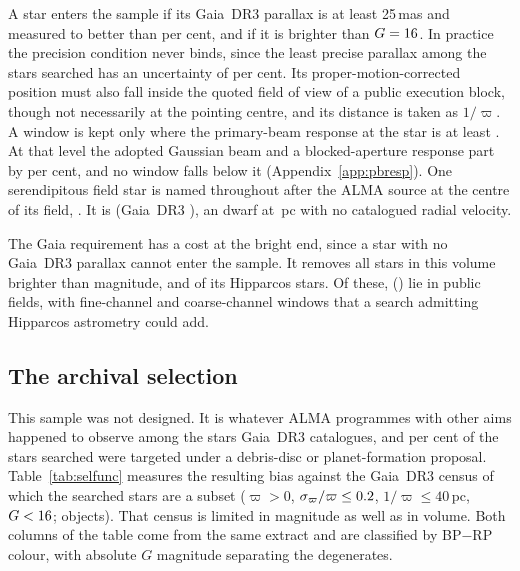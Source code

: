 A star enters the sample if its Gaia~DR3 parallax is at least 25\,mas and
measured to better than \PlxAdqlPct{} per cent, and if it is brighter than
$G=16$. In practice the precision condition
never binds, since the least precise parallax among the stars
searched has an uncertainty of \SfPlxWorstPct{} per cent.
Its proper-motion-corrected position must also fall inside the quoted field
of view of a public execution block, though not necessarily at the pointing
centre, and its distance is taken as $1/\varpi$. A window is kept only where
the primary-beam response at the star is at least \BmFloorResp. At that level
the adopted Gaussian beam and a blocked-aperture response part by
\BmFloorTolPct{} per cent, and no window falls below it
(Appendix~\ref{app:pbresp}). One serendipitous field star is named throughout
after the ALMA source at the centre of its field, \BkAlmaName. It is
\BkAlmaTwoMass{} (Gaia~DR3 \BkAlmaGaia), an \BkAlmaSpType{} dwarf at
\BkAlmaDistPc\,pc with no catalogued radial velocity.

The Gaia requirement has a cost at the bright end, since a star with no
Gaia~DR3 parallax cannot enter the sample. It removes all \BsNBright{} stars
in this volume brighter than \BsBrightMag{} magnitude, and \BsNGap{} of its
\BsNVol{} Hipparcos stars. Of these, \BsNAlmaWord{} (\BsStarList) lie in
public fields, with \BsNWinA{} fine-channel and \BsNWinB{} coarse-channel
windows that a search admitting Hipparcos astrometry could add.


\subsection{The archival selection}
\label{sec:bias}

This sample was not designed. It is whatever ALMA programmes with other aims
happened to observe among the stars Gaia~DR3 catalogues, and
\PctDiscProposal{} per cent of the stars searched were targeted under a
debris-disc or planet-formation proposal. Table~\ref{tab:selfunc} measures the
resulting bias against the Gaia~DR3 census of which the searched stars are a
subset ($\varpi>0$, $\sigma_\varpi/\varpi\le0.2$,
$1/\varpi\le40$\,pc, $G<16$; \SfCensusN{} objects). That census
is limited in magnitude as well as in volume. Both columns of the table come
from the same extract and are classified by BP$-$RP colour, with absolute $G$ magnitude separating the degenerates.

